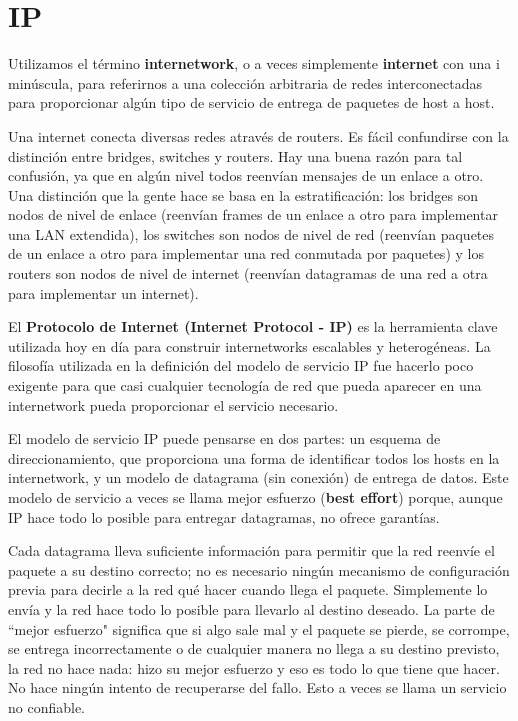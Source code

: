 \section{IP}
Utilizamos el término \textbf{internetwork}, o a veces simplemente \textbf{internet} con una i minúscula, para referirnos a una colección arbitraria de redes interconectadas para proporcionar algún tipo de servicio de entrega de paquetes de host a host.

Una internet conecta diversas redes através de routers. Es fácil confundirse con la distinción entre bridges, switches y routers. Hay una buena razón para tal confusión, ya que en algún nivel todos reenvían mensajes de un enlace a otro. Una distinción que la gente hace se basa en la estratificación: los bridges son nodos de nivel de enlace (reenvían frames de un enlace a otro para implementar una LAN extendida), los switches son nodos de nivel de red (reenvían paquetes de un enlace a otro para implementar una red conmutada por paquetes) y los routers son nodos de nivel de internet (reenvían datagramas de una red a otra para implementar un internet).

El \textbf{Protocolo de Internet (Internet Protocol - IP)} es la herramienta clave utilizada hoy en día para construir internetworks escalables y heterogéneas.
La filosofía utilizada en la definición del modelo de servicio IP fue hacerlo poco exigente para que casi cualquier tecnología de red que pueda aparecer en una internetwork pueda proporcionar el servicio necesario.

El modelo de servicio IP puede pensarse en dos partes: un esquema de direccionamiento, que proporciona una forma de identificar todos los hosts en la internetwork, y un modelo de datagrama (sin conexión) de entrega de datos. Este modelo de servicio a veces se llama mejor esfuerzo (\textbf{best effort}) porque, aunque IP hace todo lo posible para entregar datagramas, no ofrece garantías.

Cada datagrama lleva suficiente información para permitir que la red reenvíe el paquete a su destino correcto; no es necesario ningún mecanismo de configuración previa para decirle a la red qué hacer cuando llega el paquete. Simplemente lo envía y la red hace todo lo posible para llevarlo al destino deseado. La parte de ``mejor esfuerzo" significa que si algo sale mal y el paquete se pierde, se corrompe, se entrega incorrectamente o de cualquier manera no llega a su destino previsto, la red no hace nada: hizo su mejor esfuerzo y eso es todo lo que tiene que hacer. No hace ningún intento de recuperarse del fallo. Esto a veces se llama un servicio no confiable.

